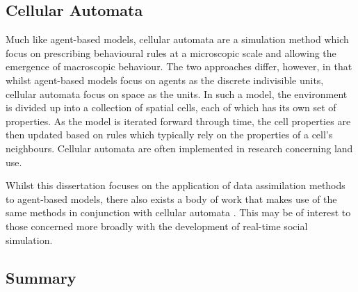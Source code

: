 



\subsection{Cellular Automata}\label{sub:lit_rev:ca}

Much like agent-based models, cellular automata are a simulation method which
focus on prescribing behavioural rules at a microscopic scale and allowing the
emergence of macroscopic behaviour.
The two approaches differ, however, in that whilst agent-based models focus on
agents as the discrete indivisible units, cellular automata focus on space as
the units.
In such a model, the environment is divided up into a collection of spatial
cells, each of which has its own set of properties.
As the model is iterated forward through time, the cell properties are then
updated based on rules which typically rely on the properties of a cell's
neighbours.
Cellular automata are often implemented in research concerning land use.

Whilst this dissertation focuses on the application of data assimilation methods
to agent-based models, there also exists a body of work that makes use of the
same methods in conjunction with cellular automata \citep{li2012assimilating,
li2017exploring}.
This may be of interest to those concerned more broadly with the development of
real-time social simulation.

\subsection{Summary}\label{sub:lit_rev:summary}


